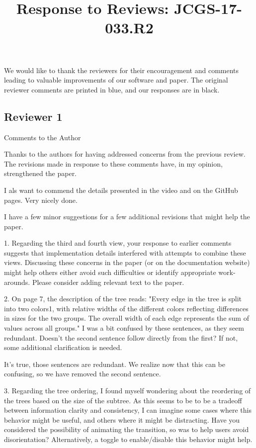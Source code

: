 \documentclass{article}
\title{Response to Reviews: JCGS-17-033.R2}
\begin{document}
\maketitle

We would like to thank the reviewers for their encouragement and comments
leading to valuable improvements of our software and paper. The original
reviewer comments are printed in blue, and our responses are in black.

\subsection{Reviewer 1}
\label{subsec:reviewer_1}

\color{blue}
Comments to the Author

Thanks to the authors for having addressed concerns from the previous review.
The revisions made in response to these comments have, in my opinion,
strengthened the paper.

I als want to commend the details presented in the video and on the GitHub
pages. Very nicely done.

I have a few minor suggestions for a few additional revisions that might help
the paper.

1. Regarding the third and fourth view, your response to earlier comments
suggests that implementation details interfered with attempts to combine these
views. Discussing these concerns in the paper (or on the documentation website)
might help others either avoid such difficulties or identify appropriate
work-arounds. Please consider adding relevant text to the paper.

\color{black}

\color{blue}
2. On page 7, the description of the tree reads: "Every edge in the tree is
split into two colors1, with relative widths of the different colors reflecting
differences in sizes for the two groups. The overall width of each edge
represents the sum of values across all groups." I was a bit confused by these
sentences, as they seem redundant. Doesn't the second sentence follow directly
from the first? If not, some additional clarification is needed.

\color{black}
It's true, those sentences are redundant. We realize now that this can be
confusing, so we have removed the second sentence.

\color{blue}
3. Regarding the tree ordering, I found myself wondering about the reordering of
the trees based on the size of the subtree. As this seems to be to be a tradeoff
between information clarity and consistency, I can imagine some cases where this
behavior might be useful, and others where it might be distracting. Have you
considered the possibility of animating the transition, so was to help users
avoid disorientation? Alternatively, a toggle to enable/disable this behavior
might help.
\end{document}
